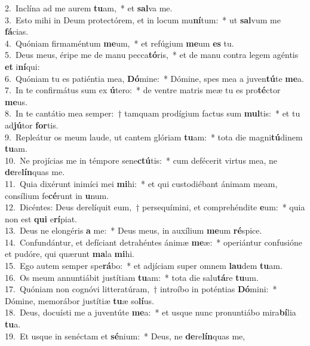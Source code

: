 {2.~}Inclína ad me aurem \textbf{tu}am,~* et \textbf{sal}va me.\\
{3.~}Esto mihi in Deum protectórem, et in locum mu\textbf{ní}tum:~* ut \textbf{sal}vum me \textbf{fá}cias.\\
{4.~}Quóniam firmaméntum \textbf{me}um,~* et refúgium \textbf{me}um \textbf{es} tu.\\
{5.~}Deus meus, éripe me de manu pecca\textbf{tó}ris,~* et de manu contra legem agéntis \textbf{et} i\textbf{ní}qui:\\
{6.~}Quóniam tu es patiéntia mea, \textbf{Dó}mine:~* Dómine, spes mea a juven\textbf{tú}te \textbf{me}a.\\
{7.~}In te confirmátus sum ex \textbf{ú}tero:~* de ventre matris meæ tu es pro\textbf{té}ctor \textbf{me}us.\\
{8.~}In te cantátio mea semper:~† tamquam prodígium factus sum \textbf{mul}tis:~* et tu ad\textbf{jú}tor \textbf{for}tis.\\
{9.~}Repleátur os meum laude, ut cantem glóriam \textbf{tu}am:~* tota die magni\textbf{tú}dinem \textbf{tu}am.\\
{10.~}Ne projícias me in témpore sene\textbf{ctú}tis:~* cum defécerit virtus mea, ne \textbf{de}re\textbf{lín}quas me.\\
{11.~}Quia dixérunt inimíci mei \textbf{mi}hi:~* et qui custodiébant ánimam meam, consílium fe\textbf{cé}runt in \textbf{u}num.\\
{12.~}Dicéntes: Deus derelíquit eum,~† persequímini, et comprehéndite \textbf{e}um:~* quia non est \textbf{qui} e\textbf{rí}piat.\\
{13.~}Deus ne elongéris \textbf{a} me:~* Deus meus, in auxílium \textbf{me}um \textbf{ré}spice.\\
{14.~}Confundántur, et defíciant detrahéntes ánimæ \textbf{me}æ:~* operiántur confusióne et pudóre, qui quærunt \textbf{ma}la \textbf{mi}hi.\\
{15.~}Ego autem semper spe\textbf{rá}bo:~* et adjíciam super omnem \textbf{lau}dem \textbf{tu}am.\\
{16.~}Os meum annuntiábit justítiam \textbf{tu}am:~* tota die salu\textbf{tá}re \textbf{tu}um.\\
{17.~}Quóniam non cognóvi litteratúram,~† introíbo in poténtias \textbf{Dó}mini:~* Dómine, memorábor justítiæ \textbf{tu}æ so\textbf{lí}us.\\
{18.~}Deus, docuísti me a juventúte \textbf{me}a:~* et usque nunc pronuntiábo mira\textbf{bí}lia \textbf{tu}a.\\
{19.~}Et usque in senéctam et \textbf{sé}nium:~* Deus, ne \textbf{de}re\textbf{lín}quas me,\\
